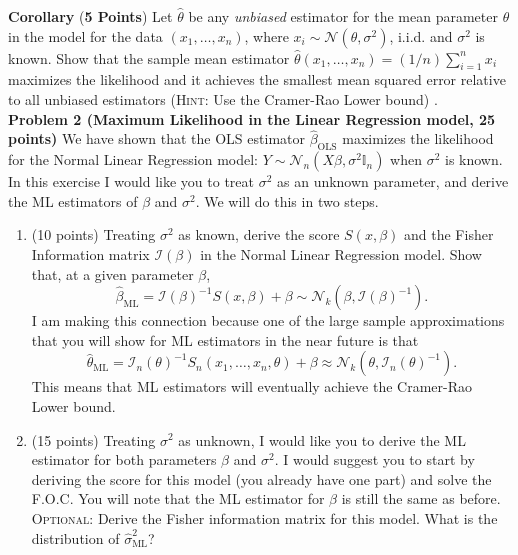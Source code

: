 \documentclass[11pt]{article} %
\begin{document}
\noindent \textbf{Corollary} (\textbf{5 Points}) Let $\widehat{\theta}$ be any \emph{unbiased} estimator for the mean parameter $\theta$ in the model for the data $(x_1,\ldots, x_n)$, where $x_i \sim \mathcal{N}(\theta, \sigma^2)$, i.i.d. and $\sigma^2$ is known. Show that the sample mean estimator
$\widehat{\theta}(x_1, \ldots, x_n) = (1/n) \sum_{i=1}^{n} x_i$
\noindent maximizes the likelihood and it achieves the smallest mean squared error relative to all unbiased estimators ({\scshape Hint:} Use the Cramer-Rao Lower bound) . \\

\noindent \textbf{Problem 2 (Maximum Likelihood in the Linear Regression model, 25 points)} We have shown that the OLS estimator $\widehat{\beta}_{\textrm{OLS}}$ maximizes the likelihood for the Normal Linear Regression model: $Y \sim \mathcal{N}_{n} (X\beta, \sigma^2 \mathbb{I}_n)$ when $\sigma^2$ is known. In this exercise I would like you to treat $\sigma^2$ as an unknown parameter, and derive the ML estimators of $\beta$ and $\sigma^2$. We will do this in two steps. 
\begin{enumerate}
\item  (10 points) Treating $\sigma^2$ as known, derive the score $S(x,\beta)$ and the Fisher Information matrix $\mathcal{I}(\beta)$  in the Normal Linear Regression model. Show that, at a given parameter $\beta$, 
	\[ \widehat{\beta}_{\textrm{ML}} =  \mathcal{I}(\beta)^{-1} S(x,\beta)  + \beta   \sim \mathcal{N}_k ( \beta, \mathcal{I}(\beta)^{-1} ). \]
	I am making this connection because one of the large sample approximations that you will show for ML estimators in the near future is that
	\[ \widehat{\theta}_{\textrm{ML}} =  \mathcal{I}_n(\theta)^{-1} S_n(x_1, \ldots, x_n,\theta)  + \beta   \approx \mathcal{N}_k ( \theta, \mathcal{I}_n(\theta)^{-1} ). \]
This means that ML estimators will eventually achieve the Cramer-Rao Lower bound.  \\

\item (15 points) Treating $\sigma^2$ as unknown, I would like you to derive the ML estimator for both parameters $\beta$ and $\sigma^2$. I would suggest you to start by deriving the score for this model (you already have one part) and solve the F.O.C. You will note that the ML estimator for $\beta$ is still the same as before. {\scshape Optional:} Derive the Fisher information matrix for this model. What is the distribution of $\widehat{\sigma}^2_{\textrm{ML}}$? 

\end{enumerate}
\end{document}
